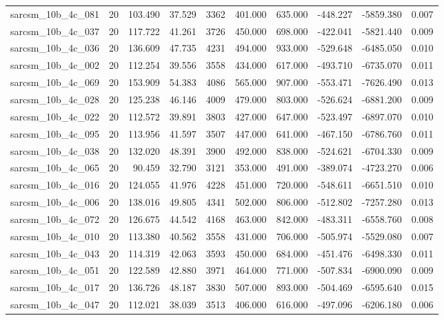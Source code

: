 \begin{tabular}{lrrrrrrrrr}
sarcsm\_10b\_4c\_081 & 20 & 103.490 & 37.529 & 3362 & 401.000 & 635.000 & -448.227 & -5859.380 & 0.007 \\
sarcsm\_10b\_4c\_037 & 20 & 117.722 & 41.261 & 3726 & 450.000 & 698.000 & -422.041 & -5821.440 & 0.009 \\
sarcsm\_10b\_4c\_036 & 20 & 136.609 & 47.735 & 4231 & 494.000 & 933.000 & -529.648 & -6485.050 & 0.010 \\
sarcsm\_10b\_4c\_002 & 20 & 112.254 & 39.556 & 3558 & 434.000 & 617.000 & -493.710 & -6735.070 & 0.011 \\
sarcsm\_10b\_4c\_069 & 20 & 153.909 & 54.383 & 4086 & 565.000 & 907.000 & -553.471 & -7626.490 & 0.013 \\
sarcsm\_10b\_4c\_028 & 20 & 125.238 & 46.146 & 4009 & 479.000 & 803.000 & -526.624 & -6881.200 & 0.009 \\
sarcsm\_10b\_4c\_022 & 20 & 112.572 & 39.891 & 3803 & 427.000 & 647.000 & -523.497 & -6897.070 & 0.010 \\
sarcsm\_10b\_4c\_095 & 20 & 113.956 & 41.597 & 3507 & 447.000 & 641.000 & -467.150 & -6786.760 & 0.011 \\
sarcsm\_10b\_4c\_038 & 20 & 132.020 & 48.391 & 3900 & 492.000 & 838.000 & -524.621 & -6704.330 & 0.009 \\
sarcsm\_10b\_4c\_065 & 20 & 90.459 & 32.790 & 3121 & 353.000 & 491.000 & -389.074 & -4723.270 & 0.006 \\
sarcsm\_10b\_4c\_016 & 20 & 124.055 & 41.976 & 4228 & 451.000 & 720.000 & -548.611 & -6651.510 & 0.010 \\
sarcsm\_10b\_4c\_006 & 20 & 138.016 & 49.805 & 4341 & 502.000 & 806.000 & -512.802 & -7257.280 & 0.013 \\
sarcsm\_10b\_4c\_072 & 20 & 126.675 & 44.542 & 4168 & 463.000 & 842.000 & -483.311 & -6558.760 & 0.008 \\
sarcsm\_10b\_4c\_010 & 20 & 113.380 & 40.562 & 3558 & 431.000 & 706.000 & -505.974 & -5529.080 & 0.007 \\
sarcsm\_10b\_4c\_043 & 20 & 114.319 & 42.063 & 3593 & 450.000 & 684.000 & -451.476 & -6498.330 & 0.011 \\
sarcsm\_10b\_4c\_051 & 20 & 122.589 & 42.880 & 3971 & 464.000 & 771.000 & -507.834 & -6900.090 & 0.009 \\
sarcsm\_10b\_4c\_017 & 20 & 136.726 & 48.187 & 3830 & 507.000 & 893.000 & -504.469 & -6595.640 & 0.015 \\
sarcsm\_10b\_4c\_047 & 20 & 112.021 & 38.039 & 3513 & 406.000 & 616.000 & -497.096 & -6206.180 & 0.006 \\

\end{tabular}
